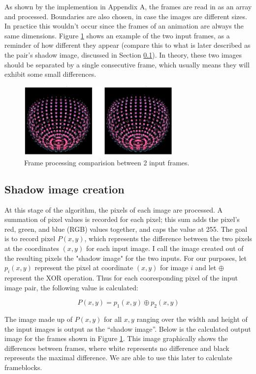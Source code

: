 \documentclass[conference]{IEEEtran}
\begin{document}
As shown by the implemention in Appendix A, the frames are
read in as an array and processed.
Boundaries are also chosen, in case the images are different sizes.
In practice this wouldn't occur since the frames of an animation are always the
same dimensions.
Figure \ref{fig:frame_processing} shows an example of the two input frames,
as a reminder of how different they appear (compare this to what is later
described as the pair's shadow image, discussed in Section
\ref{subsec:shadow_image_creation}).
In theory, these two images should be separated by a single consecutive frame,
which usually means they will exhibit some small differences.

\begin{figure}[htbp]
\centerline{\includegraphics[width=8cm]{frame_processing.png}}
\caption{Frame processing comparision between 2 input frames.}
\label{fig:frame_processing}
\end{figure}

\subsection{Shadow image creation}
\label{subsec:shadow_image_creation}
At this stage of the algorithm, the pixels of each image are processed.
A summation of pixel values is recorded for each pixel;
this sum adds the pixel's red, green, and blue (RGB) values together, and
caps the value at 255.
The goal is to record pixel $P(x,y)$,
which represents the difference between the two
pixels at the coordinates $(x,y)$ for each input image.
I call the image created out of the resulting pixels the "shadow image" for the two inputs.
For our purposes, let $p_i(x,y)$ represent the pixel at coordinate
$(x,y)$ for image $i$ and let $\oplus$ represent the XOR operation.
Thus for each cooresponding pixel of the input image pair,
the following value is calculated:

$$P(x,y) = p_1(x,y) \oplus p_2(x,y)$$

The image made up of $P(x,y)$ for all $x,y$ ranging over the width and height of
the input images is output as the ``shadow image''.
Below is the calculated output image for the frames shown in Figure
\ref{fig:frame_processing}.
This image graphically shows the differences between frames,
where white represents no difference and black represents the maximal difference.
We are able to use this later to calculate frameblocks.
\end{document}
